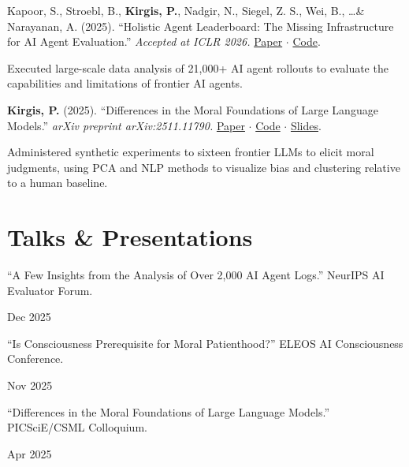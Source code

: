 \documentclass[11pt]{article}
\newcommand{\pub}[2]{%
  \par\vspace{0.5em}%
  \begin{list}{}{%
    \setlength{\leftmargin}{0.3in}%
    \setlength{\itemindent}{-0.3in}%
    \setlength{\topsep}{0pt}\setlength{\parsep}{0pt}\setlength{\partopsep}{0pt}%
  }
  \item #1%
  \par\vspace{0.2em}\small #2%
  \end{list}%
}
\newcommand{\talk}[2]{%
  \par\vspace{0.4em}%
  \noindent\parbox[t]{0.83\textwidth}{\raggedright #1}\hfill\parbox[t]{0.14\textwidth}{\raggedleft #2}\par%
}
\begin{document}
\pub{%
  Kapoor, S., Stroebl, B., \textbf{Kirgis, P.}, Nadgir, N., Siegel, Z. S., Wei, B., \ldots \& Narayanan, A. (2025). ``Holistic Agent Leaderboard: The Missing Infrastructure for AI Agent Evaluation.'' \textit{Accepted at ICLR 2026.} \href{https://arxiv.org/pdf/2510.11977}{Paper} $\cdot$ \href{https://github.com/peterkirgis/hal-paper-analysis}{Code}.%
}{%
  Executed large-scale data analysis of 21,000+ AI agent rollouts to evaluate the capabilities and limitations of frontier AI agents.%
}

\pub{%
  \textbf{Kirgis, P.} (2025). ``Differences in the Moral Foundations of Large Language Models.'' \textit{arXiv preprint arXiv:2511.11790.} \href{https://arxiv.org/pdf/2511.11790}{Paper} $\cdot$ \href{https://github.com/peterkirgis/llm-moral-foundations}{Code} $\cdot$ \href{https://peterkirgis.github.io/files/MFT_LLMs_slides.pdf}{Slides}.%
}{%
  Administered synthetic experiments to sixteen frontier LLMs to elicit moral judgments, using PCA and NLP methods to visualize bias and clustering relative to a human baseline.%
}

\section*{Talks \& Presentations}

\talk{``A Few Insights from the Analysis of Over 2,000 AI Agent Logs.'' NeurIPS AI Evaluator Forum.}{Dec 2025}
\talk{``Is Consciousness Prerequisite for Moral Patienthood?'' ELEOS AI Consciousness Conference.}{Nov 2025}
\talk{``Differences in the Moral Foundations of Large Language Models.'' PICSciE/CSML Colloquium.}{Apr 2025}
\end{document}
